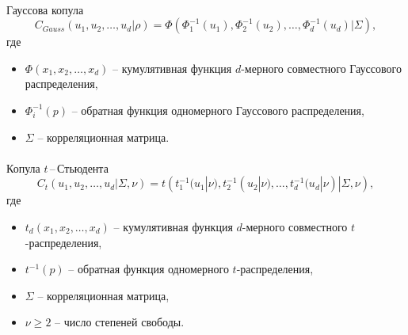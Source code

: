 \documentclass[aspectratio=169]{beamer}
\begin{document}
\begin{frame}{\insertsection}
    \framesubtitle{\insertsubsection}
    \begin{block}{Гауссова копула}
        \begin{equation}
            C_{Gauss}(u_1, u_2,\ldots, u_d|\rho) = \Phi \left( \Phi_1^{-1} (u_1), \Phi_2^{-1} (u_2), \ldots, \Phi_d^{-1} (u_d) | \Sigma \right),
        \end{equation}
        где
        \begin{itemize}
            \item $\Phi(x_1, x_2, \dots, x_d)$  -- кумулятивная функция $d$-мерного совместного Гауссового распределения,
            \item $\Phi_i^{-1}(p)$ -- обратная функция одномерного Гауссового распределения,
            \item $\Sigma$ -- корреляционная матрица.
        \end{itemize} 
    \end{block}
\end{frame}

\begin{frame}{\insertsection}
    \framesubtitle{\insertsubsection}
    \begin{block}{Копула $t$\,--\,Стьюдента}
        \begin{equation} \label{tCop}
            C_{t}(u_1, u_2,\ldots, u_d|\Sigma, \nu) = t \left( t_1^{-1} (u_1|\nu), t_2^{-1} (u_2|\nu), \ldots, t_d^{-1} (u_d|\nu) | \Sigma, \nu \right),
        \end{equation}
        где
        \begin{itemize}
            \item $t_d(x_1, x_2, \dots,x_d)$ -- кумулятивная функция $d$-мерного совместного $t$-распределения,
            \item $t^{-1}(p)$ -- обратная функция одномерного $t$-распределения,
            \item $\Sigma$ -- корреляционная матрица,
            \item $\nu \ge 2$ -- число степеней свободы.
        \end{itemize}
    \end{block}
\end{frame}
\end{document}
